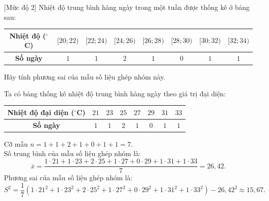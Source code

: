 \begin{bt}%
[Mức độ 2]%
Nhiệt độ trung bình hàng ngày trong một tuần được thống kê ở bảng sau:
\begin{center}
\begin{tabular}{|c|c|c|c|c|c|c|c|}
\hline
\textbf{Nhiệt độ ($^\circ$C)} & $[20; 22)$ & $[22; 24)$ & $[24; 26)$ & $[26; 28)$ & $[28; 30)$ & $[30; 32)$ & $[32; 34)$ \\
\hline
\textbf{Số ngày} & $1$ & $1$ & $2$ & $1$ & $0$ & $1$ & $1$ \\
\hline
\end{tabular}
\end{center}
Hãy tính phương sai của mẫu số liệu ghép nhóm này.
\loigiai
{
Ta có bảng thống kê nhiệt độ trung bình hàng ngày theo giá trị đại diện:
\begin{center}
\begin{tabular}{|c|c|c|c|c|c|c|c|}
\hline
\textbf{Nhiệt độ đại diện ($^\circ$C)} & $21$ & $23$ & $25$ & $27$ & $29$ & $31$ & $33$ \\
\hline
\textbf{Số ngày} & $1$ & $1$ & $2$ & $1$ & $0$ & $1$ & $1$ \\
\hline
\end{tabular}
\end{center}
Cỡ mẫu $n=1+1+2+1+0+1+1=7$.\\
Số trung bình của mẫu số liệu ghép nhóm là:
\[ \overline{x}=\dfrac{1\cdot 21+1\cdot 23+2\cdot 25+1\cdot 27+0\cdot 29+1\cdot 31+1\cdot 33}{7}=26{,}42. \]
Phương sai của mẫu số liệu ghép nhóm là:
\[ S^2=\dfrac{1}{7}\left(1\cdot 21^2+1\cdot 23^2+2\cdot 25^2+1\cdot 27^2+0\cdot 29^2+1\cdot 31^2+1\cdot 33^2 \right)-26{,}42^2\approx 15{,}67. \]
}
\end{bt}

